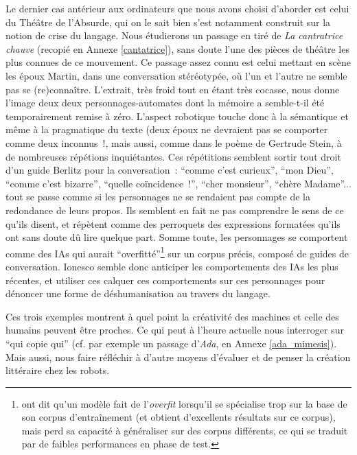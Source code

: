 \documentclass{article}
\begin{document}
				Le dernier cas antérieur aux ordinateurs que nous avons choisi d'aborder est celui du Théâtre de l'Absurde, qui on le sait bien s'est notamment construit sur la notion de crise du langage. Nous étudierons un passage en tiré de \textit{La cantratrice chauve} \cite{ionesco1950} (recopié en Annexe \ref{cantatrice}), sans doute l'une des pièces de théâtre les plus connues de ce mouvement. Ce passage assez connu est celui mettant en scène les époux Martin, dans une conversation stéréotypée, où l'un et l'autre ne semble pas se (re)connaître. L'extrait, très froid tout en étant très cocasse, nous donne l'image deux deux personnages-automates dont la mémoire a semble-t-il été temporairement remise à zéro. L'aspect robotique touche donc à la sémantique et même à la pragmatique du texte (deux époux ne devraient pas se comporter comme deux inconnus~!, mais aussi, comme dans le poème de Gertrude Stein, à de nombreuses répétions inquiétantes. Ces répétitions semblent sortir tout droit d'un guide Berlitz pour la conversation~: ``comme c'est curieux'', ``mon Dieu'', ``comme c'est
				bizarre'', ``quelle coïncidence~!'', ``cher monsieur'', ``chère Madame''... tout se passe comme si les personnages ne se rendaient pas compte de la redondance de leurs propos. Ils semblent en fait ne pas comprendre le sens de ce qu'ils disent, et répètent comme des perroquets des expressions formatées qu'ils ont sans doute dû lire quelque part. Somme toute, les personnages se comportent comme des IAs qui aurait ``overfitté''\footnote{ont dit qu'un modèle fait de l'\textit{overfit} lorsqu'il se spécialise trop sur la base de son corpus d'entraînement (et obtient d'excellents résultats sur ce corpus), mais perd sa capacité à généraliser sur des corpus différents, ce qui se traduit par de faibles performances en phase de test.} sur un corpus précis, composé de guides de conversation. Ionesco semble donc anticiper les comportements des IAs les plus récentes, et utiliser ces calquer ces comportements sur ces personnages pour dénoncer une forme de déshumanisation au travers du langage.
				
				
				Ces trois exemples montrent à quel point la créativité des machines et celle des humains peuvent être proches. Ce qui peut à l'heure actuelle nous interroger sur ``qui copie qui'' (cf. par exemple un passage d'\textit{Ada}, en Annexe \ref{ada_mimesis}). Mais aussi, nous faire réfléchir à d'autre moyens d'évaluer et de penser la création littéraire chez les robots.
\end{document}

